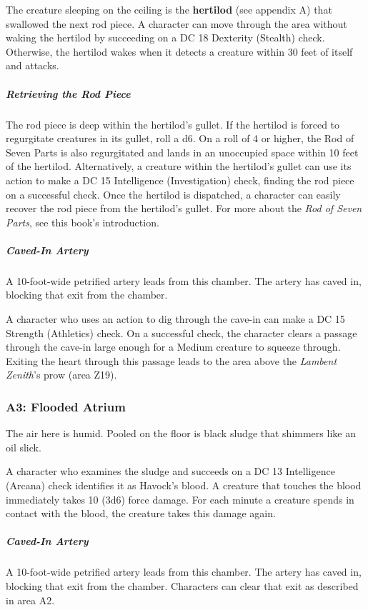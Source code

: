\documentclass[10pt,a4paper,twoside,bg=print,twocolumn,openany,nodeprecatedcode]{dndbook}
\begin{document}
The creature sleeping on the ceiling is the \textbf{hertilod} (see appendix A) that swallowed the next rod piece. A character can move through the area without waking the hertilod by succeeding on a DC 18 Dexterity (Stealth) check. Otherwise, the hertilod wakes when it detects a creature within 30 feet of itself and attacks.

\subparagraph{Retrieving the Rod Piece}
The rod piece is deep within the hertilod's gullet. If the hertilod is forced to regurgitate creatures in its gullet, roll a d6. On a roll of 4 or higher, the Rod of Seven Parts is also regurgitated and lands in an unoccupied space within 10 feet of the hertilod. Alternatively, a creature within the hertilod's gullet can use its action to make a DC 15 Intelligence (Investigation) check, finding the rod piece on a successful check. Once the hertilod is dispatched, a character can easily recover the rod piece from the hertilod's gullet. For more about the \textit{Rod of Seven Parts}, see this book's introduction.

\subparagraph{Caved-In Artery}
A 10-foot-wide petrified artery leads from this chamber. The artery has caved in, blocking that exit from the chamber.

A character who uses an action to dig through the cave-in can make a DC 15 Strength (Athletics) check. On a successful check, the character clears a passage through the cave-in large enough for a Medium creature to squeeze through. Exiting the heart through this passage leads to the area above the \textit{Lambent Zenith}'s prow (area Z19).

\subsubsection{A3: Flooded Atrium}
\begin{DndReadAloud}{}
The air here is humid. Pooled on the floor is black sludge that shimmers like an oil slick.

\end{DndReadAloud}

A character who examines the sludge and succeeds on a DC 13 Intelligence (Arcana) check identifies it as Havock's blood. A creature that touches the blood immediately takes 10 (3d6) force damage. For each minute a creature spends in contact with the blood, the creature takes this damage again.

\subparagraph{Caved-In Artery}
A 10-foot-wide petrified artery leads from this chamber. The artery has caved in, blocking that exit from the chamber. Characters can clear that exit as described in area A2.
\end{document}
